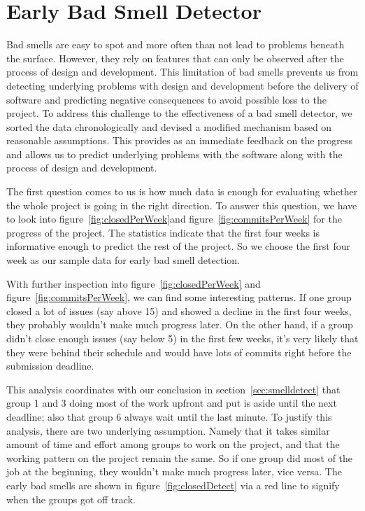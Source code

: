 \documentclass{acm_proc_article-sp}
\begin{document}
\section{Early Bad Smell Detector}\label{sec:earlydetect}

Bad smells are easy to spot and more often than not lead to problems beneath the surface. However, they rely on features that can only be observed after the process of design and development. This limitation of bad smells prevents us from detecting underlying problems with design and development before the delivery of software and predicting negative consequences to avoid possible loss to the project. To address this challenge to the effectiveness of a bad smell detector, we sorted the data chronologically and devised a modified mechanism based on reasonable assumptions. This provides as an immediate feedback on the progress and allows us to predict underlying problems with the software along with the process of design and development.

The first question comes to us is how much data is enough for evaluating whether the whole project is going in the right direction. To answer this question, we have to look into figure~\ref{fig:closedPerWeek}and figure~\ref{fig:commitsPerWeek} for the progress of the project. The statistics indicate that the first four weeks is informative enough to predict the rest of the project. So we choose the first four week as our sample data for early bad smell detection.

With further inspection into figure~\ref{fig:closedPerWeek} and figure~\ref{fig:commitsPerWeek}, we can find some interesting patterns. If one group closed a lot of issues (say above 15) and showed a decline in the first four weeks, they probably wouldn't make much progress later. On the other hand, if a group didn't close enough issues (say below 5) in the first few weeks, it's very likely that they were behind their schedule and would have lots of commits right before the submission deadline. 

This analysis coordinates with our conclusion in section~\ref{sec:smelldetect} that group 1 and 3 doing most of the work upfront and put is aside until the next deadline; also that group 6 always wait until the last minute. To justify this analysis, there are two underlying assumption. Namely that it takes similar amount of time and effort among groups to work on the project, and that the working pattern on the project remain the same. So if one group did most of the job at the beginning, they wouldn't make much progress later, vice versa. The early bad smells are shown in figure~\ref{fig:closedDetect} via a red line to signify when the groups got off track.
\end{document}
